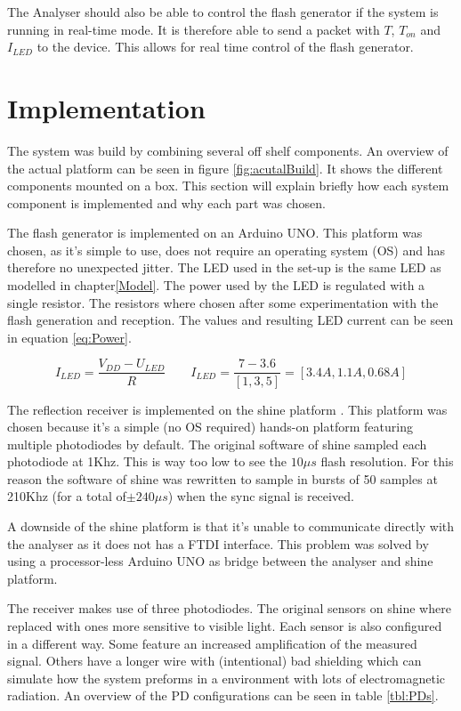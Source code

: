 The Analyser should also be able to control the flash generator if the system is running in real-time mode. It is therefore able to send a packet with $T$, ${T_{on}}$ and $I_{LED}$ to the device. This allows for real time control of the flash generator.

\section{Implementation}
The system was build by combining several off shelf components. An overview of the actual platform can be seen in figure \ref{fig:acutalBuild}. It shows the different components mounted on a box. This section will explain briefly how each system component is implemented and why each part was chosen.

The flash generator is implemented on an Arduino UNO\cite{ArduinoUno}. This platform was chosen, as it's simple to use, does not require an operating system (OS) and has therefore no unexpected jitter. The LED used in the set-up is the same LED as modelled in chapter\ref{Model}. The power used by the LED is regulated with a single resistor. The resistors where chosen after some experimentation with the flash generation and reception. The values and resulting LED current can be seen in equation \ref{eq:Power}.

\begin{equation}
\label{eq:Power}
I_{LED}=\frac{V_{DD} - U_{LED}}{R}
\qquad
I_{LED} = \frac{7 - 3.6}{[1, 3, 5]} = [3.4A, 1.1A, 0.68A]
\end{equation}

The reflection receiver is implemented on the shine platform \cite{Shine}. This platform was chosen because it's a simple (no OS required) hands-on platform featuring multiple photodiodes by default. The original software of shine sampled each photodiode at 1Khz. This is way too low to see the $10\mu s$ flash resolution. For this reason the software of shine was rewritten to sample in bursts of 50 samples at 210Khz (for a total of$\pm 240\mu s$) when the sync signal is received.

A downside of the shine platform is that it's unable to communicate directly with the analyser as it does not has a FTDI interface. This problem was solved by using a processor-less Arduino UNO as bridge between the analyser and shine platform.

The receiver makes use of three photodiodes. The original sensors on shine where replaced with ones more sensitive to visible light. Each sensor is also configured in a different way. Some feature an increased amplification of the measured signal. Others have a longer wire with (intentional) bad shielding which can simulate how the system preforms in a environment with lots of electromagnetic radiation. An overview of the PD configurations can be seen in table \ref{tbl:PDs}.


